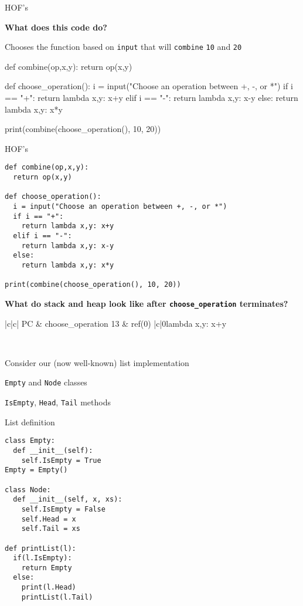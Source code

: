 \documentclass{beamer}
\begin{document}
\begin{frame}[fragile]{HOF's}
\begin{codewithblock}{\item \textbf{What does this code do?} \pause \item Chooses the function based on \texttt{input} that will \texttt{combine} \texttt{10} and \texttt{20}}
def combine(op,x,y):
  return op(x,y)

def choose_operation():
  i = input("Choose an operation between +, -, or *")
  if i == "+":
    return lambda x,y: x+y
  elif i == "-":
    return lambda x,y: x-y
  else:
    return lambda x,y: x*y
    
print(combine(choose_operation(), 10, 20))
\end{codewithblock}
\end{frame}

\begin{frame}[fragile]{HOF's}
\begin{lstlisting}
def combine(op,x,y):
  return op(x,y)

def choose_operation():
  i = input("Choose an operation between +, -, or *")
  if i == "+":
    return lambda x,y: x+y
  elif i == "-":
    return lambda x,y: x-y
  else:
    return lambda x,y: x*y
    
print(combine(choose_operation(), 10, 20))
\end{lstlisting}

\textbf{What do stack and heap look like after \texttt{choose\_operation} terminates?}

\pause

\begin{memorytable}
{|c|c|}
{PC & choose\_operation}
{13 & ref(0)}
{|c|}{0}{lambda x,y: x+y}
\end{memorytable} \ \\
\end{frame}

\begin{slide}{
\item Consider our (now well-known) list implementation
\item \texttt{Empty} and \texttt{Node} classes
\item \texttt{IsEmpty}, \texttt{Head}, \texttt{Tail} methods
}\end{slide}

\begin{frame}[fragile]{List definition}
\begin{lstlisting}
class Empty:
  def __init__(self):
    self.IsEmpty = True
Empty = Empty()

class Node:
  def __init__(self, x, xs):
    self.IsEmpty = False
    self.Head = x
    self.Tail = xs

def printList(l):
  if(l.IsEmpty):
    return Empty
  else:
    print(l.Head)
    printList(l.Tail)
\end{lstlisting}
\end{frame}
\end{document}
